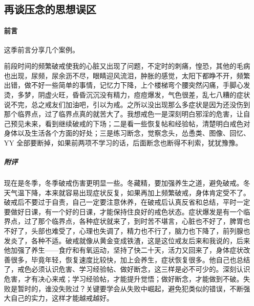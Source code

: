 \subsection{再谈压念的思想误区}

\paragraph{前言}

这季前言分享几个案例。

\begin{case}
    前段时间的频繁破戒使我的心脏又出现了问题，不定时的刺痛，惶恐，其他的毛病也出现，尿频，尿余沥不尽，眼睛迎风流泪，肿胀的感觉，太阳下都睁不开，频繁出错，做不好一些简单的事情，记忆力下降，上个楼梯弯个腰突然闪痛，手脚心发烫，多梦，阴虚火旺，昏昏沉沉没有精力，痘痘爆发，气色很差，乱七八糟的症状说不完，总之戒友们加油吧，引以为戒。之所以没出现那么多症状是因为还没伤到那个临界点，过了临界点真的就苦大了。我想戒色一是深刻明白邪淫的危害，让自己预见未来，看到继续破戒的下场；二是看一些恢复帖和经验帖，清楚明白戒色对身体以及生活各个方面的好处；三是练习断念，觉察念头，怂恿类、图像、回忆、YY 全部要断掉，如果前两项不学习的话，后面断念也断得不利索，犹犹豫豫。
    \subparagraph{附评} 现在是冬季，冬季破戒伤害更明显一些。冬藏精，要加强养生之道，避免破戒。冬天气温下降，本来就容易出现症状反复，如果再加上频繁破戒，身体肯定受不了。破戒后不要过于自责，自己一定要注意休养，在破戒后认真反省和总结，平时一定要做好日课，有一个好的日课，才能保持住良好的戒色状态。症状爆发是有一个临界点，过了那个临界点，各种症状就来了，到时苦不堪言，心脏也不好了，脾胃也不好了，头部也难受了，心理也失调了，精力也不行了，脑力也下降了，前列腺也发炎了，各种不适。破戒就像从黄金变成铁渣，这是这位戒友后来和我说的，后来他加强了养生——食疗和有氧运动，坚持了快二十天，活力又回来了，身体症状改善很多，毕竟年轻，恢复速度比较快，加上会养生，症状恢复很多。他自己也总结了，戒色必须认识危害、学习经验帖、做好断念，这三样是必不可少的。深刻认识危害，才有决心来戒；学习经验帖，才能提升觉悟；做好断念，才能做到不破。失败是暂时的，谁没失败过？关键要学会从失败中崛起，避免犯类似的错误，不断强大自己的实力，这样才能越戒越好。
\end{case}


